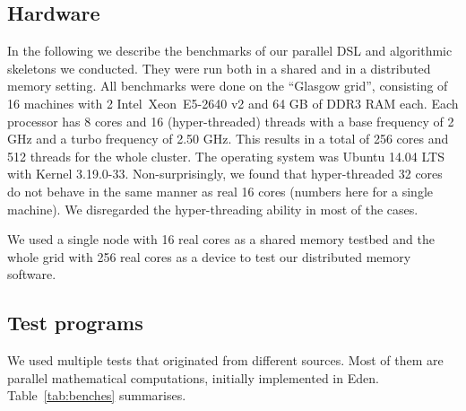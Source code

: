 \newcommand{\speedupdiffplot}[7]{
\begin{tikzpicture}
\begin{axis}[title={#1},
title style={align=center},
scale only axis, width=#7,
xlabel=Threads,
xtick distance=#4,
ytick distance=0.5,
ylabel=Absolute speedup difference,
ylabel near ticks,
grid=major,
legend entries={#2},
legend style={at={(0.99,0.99)},anchor=north east},
max space between ticks=50pt,
grid style={line width=.1pt, draw=gray!10},
major grid style={line width=.2pt,draw=gray!50},
xmin=-1,
xmax=#6]
#5
\end{axis}
\end{tikzpicture}
}

\subsection{Hardware}

In the following we describe the benchmarks of our parallel DSL and algorithmic skeletons we conducted. They were run both in a shared and in a distributed
memory setting. All benchmarks were done on the \enquote{Glasgow grid}, consisting of
16 machines with 2 Intel\SymbReg~Xeon\SymbReg~E5-2640 v2 and 64 GB of DDR3 RAM each. Each processor has 8 cores and 16 (hyper-threaded) threads with a base frequency of 2 GHz and a turbo frequency of 2.50 GHz. This results in a total of 256 cores and 512 threads for the whole cluster. The operating system was Ubuntu 14.04 LTS with Kernel 3.19.0-33. Non-surprisingly, we found that hyper-threaded 32 cores do not behave in the same manner as real 16 cores (numbers here for a single machine). We disregarded the hyper-threading ability in most of the
cases.

We used a single node with 16 real cores as a shared memory testbed
and the whole grid with 256 real cores as a device to test our
distributed memory software.

\subsection{Test programs}

We used multiple tests that originated from different
sources. Most of them are parallel mathematical computations, initially
implemented in Eden. Table~\ref{tab:benches} summarises.

